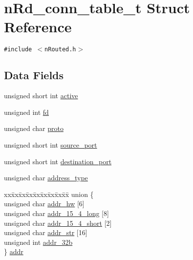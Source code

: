 \hypertarget{structnRd__conn__table__t}{
\section{n\-Rd\_\-conn\_\-table\_\-t Struct Reference}
\label{structnRd__conn__table__t}
}
{\tt \#include $<$n\-Routed.h$>$}

\subsection*{Data Fields}
\begin{CompactItemize}
\item 
unsigned short int \hyperlink{structnRd__conn__table__t_ef29a3bed84c79f36abb200754e0d8f9}{active}
\item 
unsigned int \hyperlink{structnRd__conn__table__t_a5c0f98d682b0b0c72b3d4d62b086f05}{fd}
\item 
unsigned char \hyperlink{structnRd__conn__table__t_6c975baed728a05b1bd47c7c13f2d50e}{proto}
\item 
unsigned short int \hyperlink{structnRd__conn__table__t_f096eab8cfea2f2bb18763a05114c3f5}{source\_\-port}
\item 
unsigned short int \hyperlink{structnRd__conn__table__t_c53b007ada85589b07305a287e3173cd}{destination\_\-port}
\item 
unsigned char \hyperlink{structnRd__conn__table__t_f6751f67d1c85517fe6f930da3479fec}{address\_\-type}
\item 
\begin{tabbing}
xx\=xx\=xx\=xx\=xx\=xx\=xx\=xx\=xx\=\kill
union \{\\
\>unsigned char \hyperlink{structnRd__conn__table__t_ff09c033c2910e672f3f89c6110a8695}{addr\_hw} \mbox{[}6\mbox{]}\\
\>unsigned char \hyperlink{structnRd__conn__table__t_6c297e055b95f2789f00e341e5aef58e}{addr\_15\_4\_long} \mbox{[}8\mbox{]}\\
\>unsigned char \hyperlink{structnRd__conn__table__t_b92003a2d27148c501eee1a5d3e1f1a1}{addr\_15\_4\_short} \mbox{[}2\mbox{]}\\
\>unsigned char \hyperlink{structnRd__conn__table__t_581a82e1027a1ab6f1c4f81afdc5168b}{addr\_str} \mbox{[}16\mbox{]}\\
\>unsigned int \hyperlink{structnRd__conn__table__t_ca2bf21d951dd2a9a5f7ae3cfe76c663}{addr\_32b}\\
\} \hyperlink{structnRd__conn__table__t_3fa059682daacf2b1a9c62993d22e53f}{addr}\\

\end{tabbing}\end{CompactItemize}


